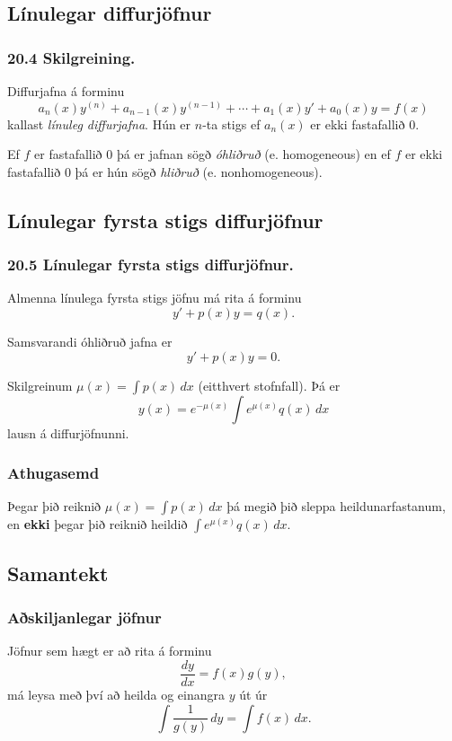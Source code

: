 \subsection[t]{Línulegar diffurjöfnur}
 \subsubsection{20.4 Skilgreining.} 
Diffurjafna á forminu
$$a_n(x)y^{(n)}+a_{n-1}(x)y^{(n-1)}+\cdots+a_1(x)y'+a_0(x)y=f(x)$$
kallast {\em línuleg diffurjafna}. \pause
Hún er $n$-ta stigs ef $a_n(x)$ er
ekki fastafallið $0$.  \pause

Ef $f$ er fastafallið $0$ þá er jafnan sögð
{\em óhliðruð} (e. homogeneous) \pause en ef $f$ er ekki fastafallið $0$ þá
er hún sögð {\em hliðruð} (e. nonhomogeneous). 
 


\subsection[t]{Línulegar fyrsta stigs diffurjöfnur}
 \subsubsection{20.5 Línulegar fyrsta stigs diffurjöfnur.}
Almenna línulega fyrsta stigs jöfnu má rita á forminu
$$y'+p(x)y=q(x).$$

\pause
Samsvarandi óhliðruð jafna er
$$y'+p(x)y=0.$$

\pause
Skilgreinum $\mu(x)=\int p(x)\,dx$ (eitthvert stofnfall).  Þá er 
$$y(x)=e^{-\mu(x)}\int e^{\mu(x)}q(x)\,dx$$
lausn á diffurjöfnunni.  


\pause

\subsubsection{Athugasemd}
Þegar þið reiknið $\mu(x)=\int p(x)\,dx$ þá
megið þið sleppa heildunarfastanum, en \textbf{ekki} þegar þið reiknið heildið 
$\int e^{\mu(x)}q(x)\,dx$.
 


\subsection[t]{Samantekt}
 \subsubsection{Aðskiljanlegar jöfnur}
 Jöfnur sem hægt er að rita á forminu
 $$
 \frac{dy}{dx} = f(x)g(y),
 $$
 má leysa með því að heilda og einangra $y$ út úr
 $$
 \int \frac 1{g(y)}\, dy = \int f(x)\, dx.
 $$
 
